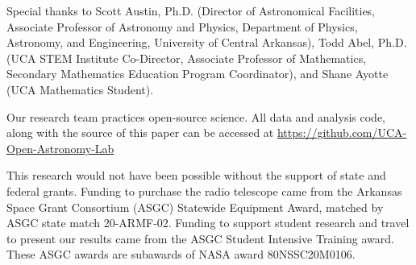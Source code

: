 \noindent Special thanks to Scott Austin, Ph.D. (Director of Astronomical Facilities, Associate Professor of Astronomy and Physics, Department of Physics, Astronomy, and Engineering, University of Central Arkansas), Todd Abel, Ph.D. (UCA STEM Institute Co-Director, Associate Professor of Mathematics, Secondary Mathematics Education Program Coordinator), and Shane Ayotte (UCA Mathematics Student).

Our research team practices open-source science. All data and analysis code, along with the source of this paper can be accessed at \url{https://github.com/UCA-Open-Astronomy-Lab}

This research would not have been possible without the support of state and federal grants. Funding to purchase the radio telescope came from the Arkansas Space Grant Consortium (ASGC) Statewide Equipment Award, matched by ASGC state match 20-ARMF-02. Funding to support student research and travel to present our results came from the ASGC Student Intensive Training award. These ASGC awards are subawards of NASA award 80NSSC20M0106.
